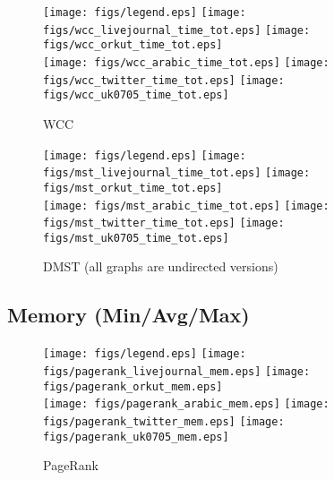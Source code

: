 \documentclass{article}
\newcommand{\bline}[1][1]{\vspace{#1\baselineskip}}
\begin{document}
\begin{figure}[!h]
  \bline[3.5]
  \centering
  \texttt{[image: figs/legend.eps]}\hspace{3em}%
  \texttt{[image: figs/wcc\_livejournal\_time\_tot.eps]}\hspace{1em}%
  \texttt{[image: figs/wcc\_orkut\_time\_tot.eps]}\\
  \texttt{[image: figs/wcc\_arabic\_time\_tot.eps]}\hspace{1em}%
  \texttt{[image: figs/wcc\_twitter\_time\_tot.eps]}\hspace{1em}%
  \texttt{[image: figs/wcc\_uk0705\_time\_tot.eps]}
  \caption{WCC}
\end{figure}

\begin{figure}[!h]
  \bline[3.5]
  \centering
  \texttt{[image: figs/legend.eps]}\hspace{3em}%
  \texttt{[image: figs/mst\_livejournal\_time\_tot.eps]}\hspace{1em}%
  \texttt{[image: figs/mst\_orkut\_time\_tot.eps]}\\
  \texttt{[image: figs/mst\_arabic\_time\_tot.eps]}\hspace{1em}%
  \texttt{[image: figs/mst\_twitter\_time\_tot.eps]}\hspace{1em}%
  \texttt{[image: figs/mst\_uk0705\_time\_tot.eps]}
  \caption{DMST (all graphs are undirected versions)}
\end{figure}

\pagebreak
\subsection{Memory (Min/Avg/Max)}
\begin{figure}[!h]
  \bline[1]
  \centering
  \texttt{[image: figs/legend.eps]}\hspace{3em}%
  \texttt{[image: figs/pagerank\_livejournal\_mem.eps]}\hspace{1em}%
  \texttt{[image: figs/pagerank\_orkut\_mem.eps]}\\
  \texttt{[image: figs/pagerank\_arabic\_mem.eps]}\hspace{1em}%
  \texttt{[image: figs/pagerank\_twitter\_mem.eps]}\hspace{1em}%
  \texttt{[image: figs/pagerank\_uk0705\_mem.eps]}
  \caption{PageRank}
\end{figure}
\end{document}
